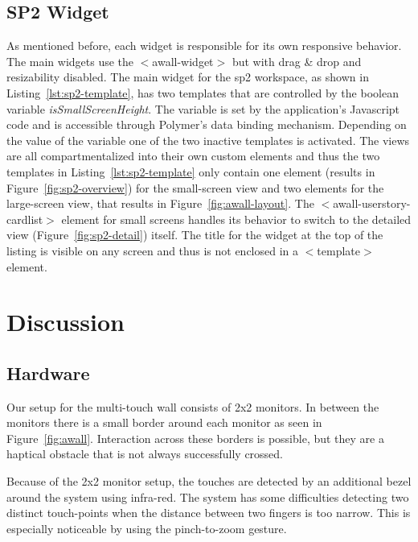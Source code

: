 \documentclass{sigchi}
\begin{document}
\subsection{SP2 Widget}
As mentioned before, each widget is responsible for its own responsive behavior.
The main widgets use the $<$awall-widget$>$ but with drag \& drop and resizability disabled.
The main widget for the \gls{sp2} workspace, as shown in Listing~\ref{lst:sp2-template}, has two templates that are controlled by the boolean variable \textit{isSmallScreenHeight}.
The variable is set by the application's Javascript code and is accessible through Polymer's data binding mechanism.
Depending on the value of the variable one of the two inactive templates is activated.
The views are all compartmentalized into their own custom elements and thus the two templates in Listing~\ref{lst:sp2-template} only contain one element (results in Figure~\ref{fig:sp2-overview}) for the small-screen view and two elements for the large-screen view, that results in Figure~\ref{fig:awall-layout}.
The $<$awall-userstory-cardlist$>$ element for small screens handles its behavior to switch to the detailed view (Figure~\ref{fig:sp2-detail}) itself.
The title for the widget at the top of the listing is visible on any screen and thus is not enclosed in a $<$template$>$ element.


\section{Discussion}

\subsection{Hardware}
Our setup for the multi-touch wall consists of 2x2 monitors.
In between the monitors there is a small border around each monitor as seen in Figure~\ref{fig:awall}.
Interaction across these borders is possible, but they are a haptical obstacle that is not always successfully crossed.

Because of the 2x2 monitor setup, the touches are detected by an additional bezel around the system using infra-red.
The system has some difficulties detecting two distinct touch-points when the distance between two fingers is too narrow.
This is especially noticeable by using the pinch-to-zoom gesture.
\end{document}
